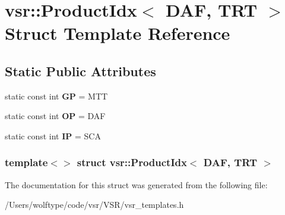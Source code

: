 \hypertarget{structvsr_1_1_product_idx_3_01_d_a_f_00_01_t_r_t_01_4}{\section{vsr\-:\-:Product\-Idx$<$ D\-A\-F, T\-R\-T $>$ Struct Template Reference}
\label{structvsr_1_1_product_idx_3_01_d_a_f_00_01_t_r_t_01_4}
}
\subsection*{Static Public Attributes}
\begin{DoxyCompactItemize}
\item 
\hypertarget{structvsr_1_1_product_idx_3_01_d_a_f_00_01_t_r_t_01_4_a1a726001510016aafb3dd16ccdb0275c}{static const int {\bfseries G\-P} = M\-T\-T}\label{structvsr_1_1_product_idx_3_01_d_a_f_00_01_t_r_t_01_4_a1a726001510016aafb3dd16ccdb0275c}

\item 
\hypertarget{structvsr_1_1_product_idx_3_01_d_a_f_00_01_t_r_t_01_4_ac01d0634e96f4aefdfacbd666a6b1d7a}{static const int {\bfseries O\-P} = D\-A\-F}\label{structvsr_1_1_product_idx_3_01_d_a_f_00_01_t_r_t_01_4_ac01d0634e96f4aefdfacbd666a6b1d7a}

\item 
\hypertarget{structvsr_1_1_product_idx_3_01_d_a_f_00_01_t_r_t_01_4_a5fcb798ed91f099bd360421b03f1d106}{static const int {\bfseries I\-P} = S\-C\-A}\label{structvsr_1_1_product_idx_3_01_d_a_f_00_01_t_r_t_01_4_a5fcb798ed91f099bd360421b03f1d106}

\end{DoxyCompactItemize}
\subsubsection*{template$<$$>$ struct vsr\-::\-Product\-Idx$<$ D\-A\-F, T\-R\-T $>$}



The documentation for this struct was generated from the following file\-:\begin{DoxyCompactItemize}
\item 
/\-Users/wolftype/code/vsr/\-V\-S\-R/vsr\-\_\-templates.\-h\end{DoxyCompactItemize}
